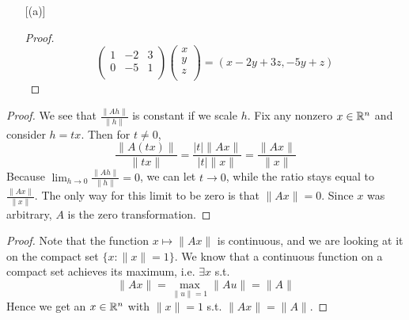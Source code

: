 \documentclass[11pt]{article}
\begin{document}
\begin{exercise}{2}
\begin{enumerate} [(a)]
\begin{proof}
\begin{equation*}
\begin{pmatrix}
                    1 & -2 & 3 \\
                    0 & -5 & 1 \\
                \end{pmatrix} \begin{pmatrix}
                    x \\
                    y \\
                    z \\
                \end{pmatrix} = (x - 2y+3z, -5y + z)
            \end{equation*}
        \end{proof}
    \end{enumerate}
\end{exercise}

\begin{exercise}{3}
    \begin{proof}
        We see that $\frac{\| Ah \|}{\| h \|}$ is constant if we scale $h$. Fix any nonzero $x \in \mathbb{R}^n$ and consider $h = tx$. Then for $t \neq 0$, $$\frac{\| A(tx) \| }{\| tx \| } = \frac{|t| \| Ax \| }{|t| \| x \| } = \frac{\| Ax \| }{\| x \| }$$ Because $\lim_{h \to 0} \frac{\| Ah \| }{\| h \| } = 0$, we can let $t \to 0$, while the ratio stays equal to $\frac{\| Ax \| }{\| x\| }$. The only way for this limit to be zero is that $\| Ax \| = 0$. Since $x$ was arbitrary, $A$ is the zero transformation. 
    \end{proof}
\end{exercise}

\begin{exercise}{4}
    \begin{proof}
        Note that the function $x \mapsto \| Ax \| $ is continuous, and we are looking at it on the compact set $\{ x : \| x \| = 1 \}$. We know that a continuous function on a compact set achieves its maximum, i.e. $\exists x$ s.t. $$\| Ax \| = \max_{\| u \| = 1} \| Au\| = \| A \|$$ Hence we get an $x \in \mathbb{R}^n$ with $\| x \| = 1$ s.t. $\|Ax \| = \| A \| $. 
    \end{proof}
\end{exercise}
\end{document}
